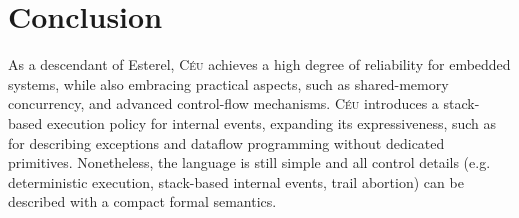 \documentclass{acm_proc_article-sp}
\newcommand{\CEU}{\textsc{C\'{e}u}\xspace}
\newcommand{\code}[1] {{\small{\texttt{#1}}}}
\newcommand{\1}{\;}
\newcommand{\2}{\;\;}
\newcommand{\3}{\;\;\;}
\newcommand{\5}{\;\;\;\;\;}
\begin{document}

\section{Conclusion}
\label{sec.conclusion}

As a descendant of Esterel, \CEU achieves a high degree of reliability for 
embedded systems, while also embracing practical aspects, such as
shared-memory concurrency, and advanced control-flow mechanisms.
%
\CEU introduces a stack-based execution policy for internal events, expanding 
its expressiveness, such as for describing exceptions and dataflow programming 
without dedicated primitives.
%
Nonetheless, the language is still simple and all control details (e.g. 
deterministic execution, stack-based internal events, trail abortion) can be 
described with a compact formal semantics.

\end{document}
